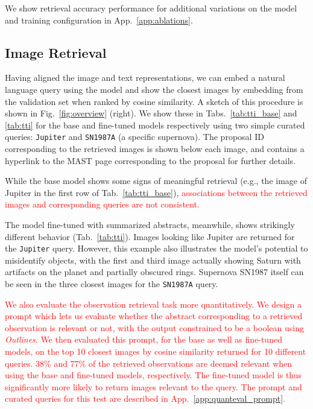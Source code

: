 \documentclass{article} %
\newcommand{\package}[1]{\textsl{#1}\xspace}
\newcommand{\changes}[1]{\textcolor{red}{#1}}
\begin{document}
   We show retrieval accuracy performance for additional variations on the model and training configuration in App.~\ref{app:ablations}.
   
   \subsection{Image Retrieval}
   
   Having aligned the image and text representations, we can embed a natural language query using the model and show the closest images by embedding from the validation set when ranked by cosine similarity. A sketch of this procedure is shown in Fig.~\ref{fig:overview} (right).
   We show these in Tabs.~\ref{tab:tti_base} and \ref{tab:tti} for the base and fine-tuned models respectively using two simple curated queries: \texttt{Jupiter} and  \texttt{SN1987A} (a specific supernova). The proposal ID corresponding to the retrieved images is shown below each image, and contains a hyperlink to the MAST page corresponding to the proposal for further details.
   
   While the base model shows some signs of meaningful retrieval (e.g., the image of Jupiter in the first row of Tab.~\ref{tab:tti_base}), 
   \changes{associations between the retrieved images and corresponding queries are not consistent.}
   
   The model fine-tuned with summarized abstracts, meanwhile, shows strikingly different behavior (Tab.~\ref{tab:tti}).
   Images looking like Jupiter are returned for the \texttt{Jupiter} query. 
   However, this example also illustrates the model's potential to misidentify objects, with the first and third image actually showing Saturn with artifacts on the planet and partially obscured rings.
   Supernova SN1987 itself can be seen in the three closest images for the \texttt{SN1987A} query.  %

   \changes{We also evaluate the observation retrieval task more quantitatively. We design a prompt which lets us evaluate whether the abstract corresponding to a retrieved observation is relevant or not, with the output constrained to be a boolean using \package{Outlines}. We then evaluated this prompt, for the base as well as fine-tuned models, on the top 10 closest images by cosine similarity returned for 10 different queries. 38\% and 77\% of the retrieved observations are deemed relevant when using the base and fine-tuned models, respectively. The fine-tuned model is thus significantly more likely to return images relevant to the query. The prompt and curated queries for this test are described in App.~\ref{app:quanteval_prompt}.}
   
\end{document}
